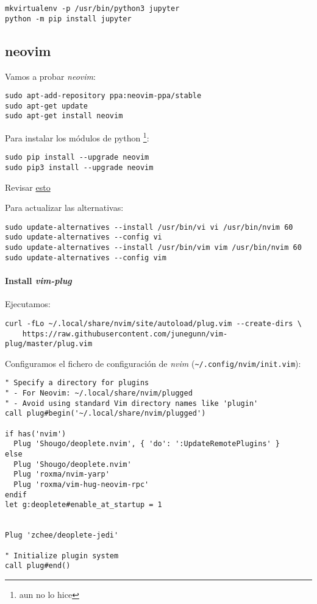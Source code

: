 \documentclass[
  12pt,
  spanish,
]{article}
\begin{document}
\begin{verbatim}
mkvirtualenv -p /usr/bin/python3 jupyter
python -m pip install jupyter 
\end{verbatim}

\hypertarget{neovim}{%
\subsection{neovim}\label{neovim}}

Vamos a probar \emph{neovim}:

\begin{verbatim}
sudo apt-add-repository ppa:neovim-ppa/stable
sudo apt-get update
sudo apt-get install neovim
\end{verbatim}

Para instalar los módulos de python \footnote{aun no lo hice}:

\begin{verbatim}
sudo pip install --upgrade neovim
sudo pip3 install --upgrade neovim
\end{verbatim}

Revisar
\href{https://neovim.io/doc/user/provider.html\#provider-python}{esto}

Para actualizar las alternativas:

\begin{verbatim}
sudo update-alternatives --install /usr/bin/vi vi /usr/bin/nvim 60
sudo update-alternatives --config vi
sudo update-alternatives --install /usr/bin/vim vim /usr/bin/nvim 60
sudo update-alternatives --config vim
\end{verbatim}

\hypertarget{install-vim-plug}{%
\paragraph{\texorpdfstring{Install
\emph{vim-plug}}{Install vim-plug}}\label{install-vim-plug}}

Ejecutamos:

\begin{verbatim}
curl -fLo ~/.local/share/nvim/site/autoload/plug.vim --create-dirs \
    https://raw.githubusercontent.com/junegunn/vim-plug/master/plug.vim
\end{verbatim}

Configuramos el fichero de configuración de \emph{nvim}
(\texttt{\textasciitilde{}/.config/nvim/init.vim}):

\begin{verbatim}
" Specify a directory for plugins
" - For Neovim: ~/.local/share/nvim/plugged
" - Avoid using standard Vim directory names like 'plugin'
call plug#begin('~/.local/share/nvim/plugged')

if has('nvim')
  Plug 'Shougo/deoplete.nvim', { 'do': ':UpdateRemotePlugins' }
else
  Plug 'Shougo/deoplete.nvim'
  Plug 'roxma/nvim-yarp'
  Plug 'roxma/vim-hug-neovim-rpc'
endif
let g:deoplete#enable_at_startup = 1


Plug 'zchee/deoplete-jedi'

" Initialize plugin system
call plug#end()
\end{verbatim}
\end{document}
